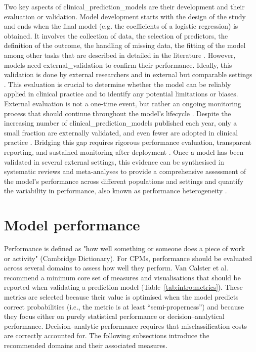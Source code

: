 Two key aspects of \glspl{clinical_prediction_model} are their development and their evaluation or validation. Model development starts with the design of the study and ends when the final model (e.g. the coefficients of a logistic regression) is obtained. It involves the collection of data, the selection of predictors, the definition of the outcome, the handling of missing data, the fitting of the model among other tasks that are described in detailed in the literature \cite{efthimiou_developing_2024,wynantsKeyStepsCommon2017}. However, models need \gls{external_validation} to confirm their performance. Ideally, this validation is done by external researchers and in external but comparable settings \cite{gulatiGeneralizabilityCardiovascularDisease2022,siontisExternalValidationNew2015}. This evaluation is crucial to determine whether the model can be reliably applied in clinical practice and to identify any potential limitations or biases. External evaluation is not a one-time event, but rather an ongoing monitoring process that should continue throughout the model's lifecycle \cite{vancalsterThereNoSuch2023}. Despite the increasing number of \glspl{clinical_prediction_model} published each year, only a small fraction are externally validated, and even fewer are adopted in clinical practice \cite{bouwmeesterReportingMethodsClinical2012, collinsExternalValidationMultivariable2014,arshiNumberPublicationsNew2025}. Bridging this gap requires rigorous performance evaluation, transparent reporting, and sustained monitoring after deployment \cite{vancalsterThereNoSuch2023, van2026enemies}. Once a model has been validated in several external settings, this evidence can be synthesised in systematic reviews and meta-analyses to provide a comprehensive assessment of the model's performance across different populations and settings and quantify the variability in performance, also known as performance \gls{heterogeneity} \cite{snellTransparentReportingMultivariable2023}. 


\section{Model performance}

Performance is defined as "how well something or someone does a piece of work or activity" (Cambridge Dictionary). For \glspl{CPM}, performance should be evaluated across several domains to assess how well they perform. Van Calster et al.\ \cite{vancalsterPerformanceEvaluationPredictive2024} recommend a minimum core set of measures and visualisations that should be reported when validating a prediction model (Table~\ref{tab:intro:metrics}). These metrics are selected because their value is optimised when the model predicts correct probabilities (i.e., the metric is at least \enquote{semi-\gls{properness}}) and because they focus either on purely statistical performance or decision--analytical performance. Decision--analytic performance requires that misclassification costs are correctly accounted for. The following subsections introduce the recommended domains and their associated measures.

